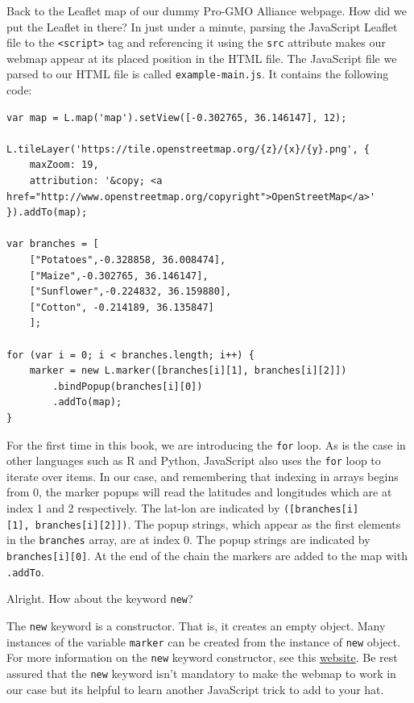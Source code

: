 \documentclass[
]{book}
\begin{document}
Back to the Leaflet map of our dummy Pro-GMO Alliance webpage. How did we put the Leaflet in there? In just under a minute, parsing the JavaScript Leaflet file to the \texttt{\textless{}script\textgreater{}} tag and referencing it using the \texttt{src} attribute makes our webmap appear at its placed position in the HTML file. The JavaScript file we parsed to our HTML file is called \texttt{example-main.js}. It contains the following code:

\begin{verbatim}
var map = L.map('map').setView([-0.302765, 36.146147], 12);

L.tileLayer('https://tile.openstreetmap.org/{z}/{x}/{y}.png', {
    maxZoom: 19,
    attribution: '&copy; <a href="http://www.openstreetmap.org/copyright">OpenStreetMap</a>'
}).addTo(map);

var branches = [
    ["Potatoes",-0.328858, 36.008474],
    ["Maize",-0.302765, 36.146147],
    ["Sunflower",-0.224832, 36.159880],
    ["Cotton", -0.214189, 36.135847]
    ];

for (var i = 0; i < branches.length; i++) {
    marker = new L.marker([branches[i][1], branches[i][2]])
        .bindPopup(branches[i][0])
        .addTo(map);
}
\end{verbatim}

For the first time in this book, we are introducing the \texttt{for} loop. As is the case in other languages such as R and Python, JavaScript also uses the \texttt{for} loop to iterate over items. In our case, and remembering that indexing in arrays begins from 0, the marker popups will read the latitudes and longitudes which are at index 1 and 2 respectively. The lat-lon are indicated by \texttt{({[}branches{[}i{]}{[}1{]},\ branches{[}i{]}{[}2{]}{]})}. The popup strings, which appear as the first elements in the \texttt{branches} array, are at index 0. The popup strings are indicated by \texttt{branches{[}i{]}{[}0{]}}. At the end of the chain the markers are added to the map with \texttt{.addTo}.

Alright. How about the keyword \texttt{new}?

The \texttt{new} keyword is a constructor. That is, it creates an empty object. Many instances of the variable \texttt{marker} can be created from the instance of \texttt{new} object. For more information on the \texttt{new} keyword constructor, see this \href{https://www.programiz.com/javascript/constructor-function}{website}. Be rest assured that the \texttt{new} keyword isn't mandatory to make the webmap to work in our case but its helpful to learn another JavaScript trick to add to your hat.
\end{document}
